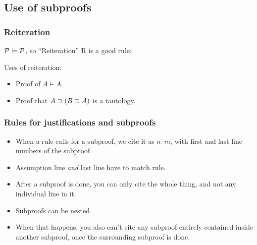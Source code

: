 \subsection{Use of subproofs}

\begin{frame}
  \frametitle{Reiteration}

  $\mathcal{P} \models \mathcal{P}$, so ``Reiteration'' R is a good rule:

  \begin{fitchproof}
     
  \end{fitchproof}

  Uses of reiteration:
  \begin{itemize}[<+->]
    \item Proof of $A \models A$.
    \item Proof that $A \supset (B \supset A)$ is a tautology.
  \end{itemize}
\end{frame}

\begin{frame}
  \begin{fitchproof}
    \open
    \close
  \end{fitchproof}
\end{frame}

\begin{frame}
  \begin{fitchproof}
    \open
    \open
    \close
    \close
  \end{fitchproof}
\end{frame}

\begin{frame}
  \frametitle{Rules for justifications and subproofs}

  \begin{itemize}[<+->]
    \item When a rule calls for a subproof, we cite it as $n$--$m$,
    with first and last line numbers of the subproof.
    \item Assumption line \emph{and} last line have to match rule.
    \item After a subproof is done, you can only cite the whole thing,
    and not any individual line in it.
    \item Subproofs can be nested.
    \item When that happens, you also can't cite any subproof entirely
    contained inside another subproof, once the surrounding subproof
    is done.
  \end{itemize}
\end{frame}


